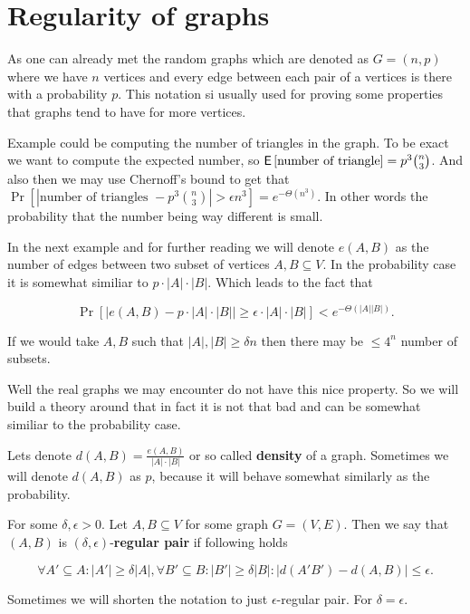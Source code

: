 \chapter{Regularity of graphs}

As one can already met the random graphs which are denoted as $G = (n,p)$ where we have $n$ vertices and every edge between each pair of a vertices is there with a probability $p$. This notation si usually used for proving some properties that graphs tend to have for more vertices.

Example could be computing the number of triangles in the graph. To be exact we want to compute the expected number, so $\operatorname{\textsf{E}\,} [\text{number of triangle}] = p^3 \binom{n}{3}$. And also then we may use Chernoff's bound to get that $\Pr \left[|\text{number of triangles } - p^3 \binom{n}{3}| > \epsilon n^3\right] = e^{-\Theta(n^3)}$. In other words the probability that the number being way different is small.

In the next example and for further reading we will denote $e(A,B)$ as the number of edges between two subset of vertices $A, B \subseteq V$. In the probability case it is somewhat similiar to $p \cdot |A| \cdot |B|$. Which leads to the fact that

$$
\Pr \left[\left|e(A,B) - p \cdot |A| \cdot |B|\right| \geq \epsilon \cdot |A|\cdot |B| \right] < e^{-\Theta(|A||B|)}.
$$

If we would take $A, B$ such that $|A|, |B| \geq \delta n$ then there may be $\leq 4^n$ number of subsets.

Well the real graphs we may encounter do not have this nice property. So we will build a theory around that in fact it is not that bad and can be somewhat similiar to the probability case.

\begin{defn}
	Lets denote $d(A,B) = \frac{e(A,B)}{|A| \cdot |B|}$ or so called \textbf{density} of a graph. Sometimes we will denote $d(A,B)$ as $p$, because it will behave somewhat similarly as the probability.
\end{defn}

\begin{defn}
	For some $\delta, \epsilon > 0$. Let $A, B \subseteq V$ for some graph $G = (V,E)$. Then we say that $(A,B)$ is $(\delta, \epsilon)$-\textbf{regular pair} if following holds
	
	$$
	\forall A' \subseteq A : |A'| \geq \delta |A|, \forall B' \subseteq B : |B'| \geq \delta |B| : |d(A'B') - d(A,B)| \leq \epsilon.
	$$
	
	Sometimes we will shorten the notation to just $\epsilon$-regular pair. For $\delta = \epsilon$.
\end{defn}

